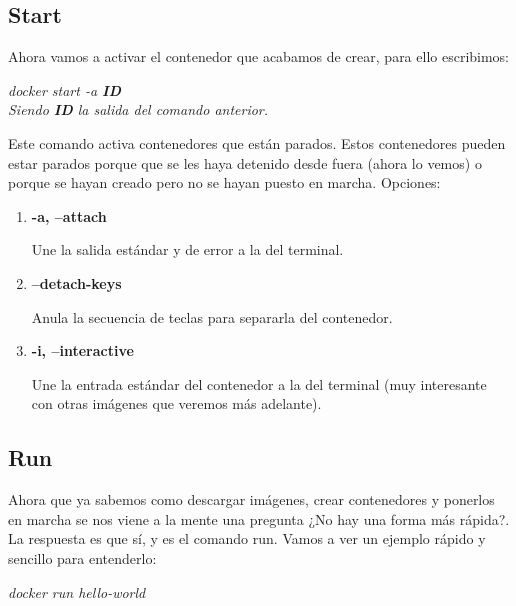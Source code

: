 \documentclass[]{article}
\begin{document}
\subsection{Start}

Ahora vamos a activar el contenedor que acabamos de crear, para ello escribimos:

\begin{center}
	
	\it docker start -a {\bf ID}
	\\ Siendo {\bf ID} la salida del comando anterior.
\end{center}

Este comando activa contenedores que están parados.
Estos contenedores pueden estar parados porque que se les haya detenido desde fuera (ahora lo vemos) o porque se hayan creado pero no se hayan puesto en marcha.
Opciones:

\begin{enumerate}

\renewcommand{\labelenumi}{$ \bullet $}

	\item {\bf -a, --attach}
	
	Une la salida estándar y de error a la del terminal.
	
	\item {\bf--detach-keys}
	
	Anula la secuencia de teclas para separarla del contenedor.
	
	\item {\bf-i, --interactive}
	
	Une la entrada estándar del contenedor a la del terminal (muy interesante con otras imágenes que veremos más adelante). 

\end{enumerate}


\subsection{Run}

Ahora que ya sabemos como descargar imágenes, crear contenedores y ponerlos en marcha se nos viene a la mente una pregunta ¿No hay una forma más rápida?.
La respuesta es que sí, y es el comando run.
Vamos a ver un ejemplo rápido y sencillo para entenderlo:

\begin{center}

	\it docker run hello-world

\end{center}
\end{document}
